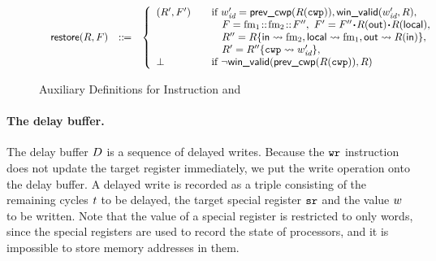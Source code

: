 \begin{figure}[!t]
\[\begin{array}{l}
\begin{array}{lcl}
            \incwin(\RFile, \Wstack) & \define &
            \left\{
            \begin{array}{ll}
                (\RFile', \Wstack')
                & \quad \text{if }
                             \cwp' = \postcwp(\RFile(\regcwp)),
                             \winvalid(\cwp', \RFile), \\
                & \quad \ \ \
                             \Wstack = \fm_1 \stCons \fm_2 \stCons \Wstack''  , \
                              \Wstack' = \Wstack''\lstApp \RFile(\outRN)
                                                  \lstApp \RFile(\localRN), \\
                & \quad \ \ \ \RFile'' =
                \RFile\{\inRN\rightsquigarrow \fm_2,
                        \localRN\rightsquigarrow \fm_1,
                        \outRN \rightsquigarrow \RFile(\inRN)\},
                \\
                 & \quad \ \ \
                            \RFile' = \fsubst{\RFile''}\regcwp{\cwp'},
                 \\
                \perp &\quad \text{if }
                                  \lnot\winvalid(\postcwp(R(\regcwp)), \RFile)
            \end{array}
            \right.
        \end{array}
    \end{array}
    \]
    \caption{Auxiliary Definitions for Instruction \csave{} and \crestore}
    \label{fig:save and restore}
\end{figure}

\paragraph{\textbf{The delay buffer.}}
The delay buffer $D$ is a sequence of delayed writes.
Because the  $\texttt{wr}$ instruction
does not update the target register immediately,
we put the write operation onto the delay buffer.
A delayed write is recorded as a triple consisting of
the remaining cycles $t$ to be delayed,
the target special register $\texttt{sr}$ and the value
$w$ to be written. 
Note that the value of a special register is restricted to 
only words, since the special registers are used to record the
state of processors, and it is impossible to
store memory addresses in them.

